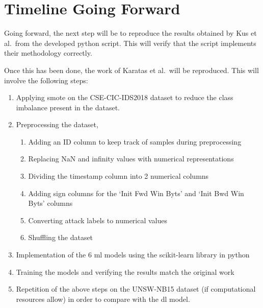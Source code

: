 \chapter{Timeline Going Forward}%
\label{chp:timeline}

Going forward, the next step will be to reproduce the results obtained by Kus
et al.\ from the developed python script. This will verify that the script
implements their methodology correctly.

Once this has been done, the work of Karatas et al.\ will be reproduced. This
will involve the following steps:
\begin{enumerate}
      \item Applying \gls{smote} on the CSE-CIC-IDS2018 dataset to reduce the class
            imbalance present in the dataset.
      \item Preprocessing the dataset,
            \begin{enumerate}
                  \item Adding an ID column to keep track of samples during preprocessing
                  \item Replacing NaN and infinity values with numerical representations
                  \item Dividing the timestamp column into 2 numerical columns
                  \item Adding sign columns for the `Init Fwd Win Byts' and `Init Bwd Win Byts' columns
                  \item Converting attack labels to numerical values
                  \item Shuffling the dataset
            \end{enumerate}
      \item Implementation of the 6 \gls{ml} models using the scikit-learn library in
            python
      \item Training the models and verifying the results match the original work
      \item Repetition of the above steps on the UNSW-NB15 dataset (if computational
            resources allow) in order to compare with the \gls{dl} model.
\end{enumerate}

